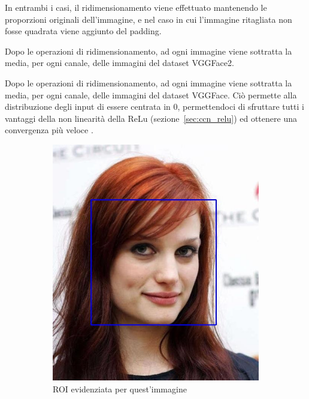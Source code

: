 In entrambi i casi, il ridimensionamento viene effettuato mantenendo le proporzioni originali dell'immagine, e nel caso in cui l'immagine ritagliata non fosse quadrata viene aggiunto del padding. 

Dopo le operazioni di ridimensionamento, ad ogni immagine viene sottratta la media, per ogni canale, delle immagini del dataset VGGFace2.

Dopo le operazioni di ridimensionamento, ad ogni immagine viene sottratta la media, per ogni canale, delle immagini del dataset VGGFace. Ciò permette alla distribuzione degli input di essere centrata in $0$, permettendoci di sfruttare tutti i vantaggi della non linearità della ReLu (sezione~\ref{sec:ccn_relu}) ed ottenere una convergenza più veloce \cite{miviaage}.

\begin{figure}[ht]
\centering
\begin{subfigure}{0.3\textwidth}
\includegraphics[width=\textwidth]{./Images/detection.jpg}
\caption{ROI evidenziata per quest'immagine}
\label{sfig:detection}
\end{subfigure}
\hspace{0.1\textwidth}
\begin{subfigure}{0.3\textwidth}

\end{subfigure}
\end{figure}
